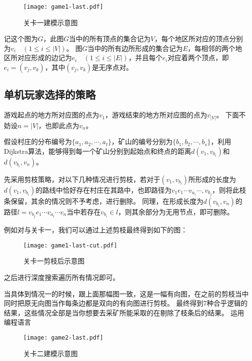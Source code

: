 \documentclass{cumcmthesis}
\begin{document}
\begin{figure}[!h]
	\centering
	\texttt{[image: game1-last.pdf]}
	\caption{关卡一建模示意图}
\end{figure}
记这个图为$G$，此图$G$当中的所有顶点的集合记为$V$，每个地区所对应的顶点分别为$v_i\quad (1\leq i\leq |V|)$。
图$G$当中的所有边所形成的集合记为$E$，每相邻的两个地区所对应形成的边记为$e_i\quad (1\leq i\leq |E|)$，并且每个$e_i$对应着两个顶点，即$e_i=(v_j,v_k)$，其中$(v_j,v_k)$是无序点对。\par

\subsection{单机玩家选择的策略}
游戏起点的地方所对应图的点为$v_1$，游戏结束的地方所对应图的点为$v_{|V|}$。
下面不妨设$n=|V|$，也即此点为$v_n$。\par

假设村庄的分布编号为$\{a_1,a_2,\cdots,a_t\}$，矿山的编号分别为$\{b_1,b_2,\cdots,b_s\}$，利用Dijkstra算法，能够得到每一个矿山分别到起始点和终点的距离$d(v_1,v_{b_i})$和$d(v_{b_i},v_n)$。\par

先采用剪枝策略，对以下几种情况进行剪枝，若对于$(v_1,v_{b_i})$所形成的长度为$d(v_1,v_{b_i})$的路线中恰好存在村庄在其路中，也即路径为$v_1e_1\cdots v_{a_i}\cdots ,v_{b_j}$，则将此枝条保留，其余的情况则不予考虑，进行删除。
同理，在形成长度为$d(v_{b_i},v_n)$的路径$l=v_{b_j}e_1\cdots v_{a_i}\cdots v_n$当中若存在$v_{b_i}\in l$，则其余部分为无用节点，即可删除。\par
例如对与关卡一，我们可以通过上述剪枝最终得到如下的图：\par

\begin{figure}[!h]
	\centering
	\texttt{[image: game1-last-cut.pdf]}
	\caption{关卡一剪枝后示意图}
\end{figure}
之后进行深度搜索遍历所有情况即可。\par

当具体到情况一的时候，跟上面那幅图一致，这是一幅有向图，在之前的剪枝当中同时把原无向图当作每条边都是双向的有向图进行剪枝。
最终得到7种合乎逻辑的结果，这些情况全部是当你想要去采矿所能采取的在剔除了枝条后的结果。
运用编程语言



\begin{figure}[!h]
	\centering
	\texttt{[image: game2-last.pdf]}
	\caption{关卡二建模示意图}
\end{figure}
\end{document}
